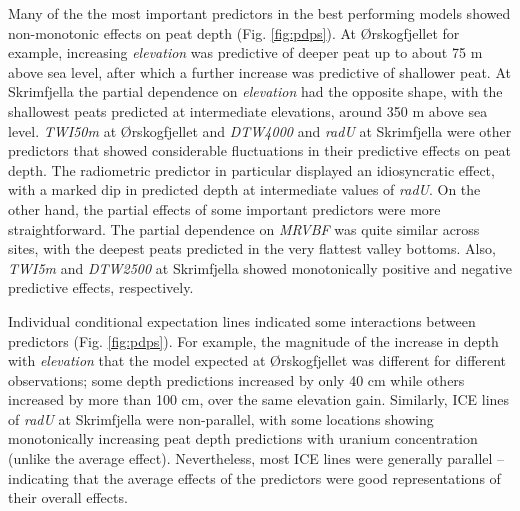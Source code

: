 \documentclass[soil, manuscript]{copernicus}
\begin{document}
Many of the the most important predictors in the best performing models showed non-monotonic effects on peat depth (Fig. \ref{fig:pdps}).
At Ørskogfjellet for example, increasing \emph{elevation} was predictive of deeper peat up to about 75 m above sea level, after which a further increase was predictive of shallower peat.
At Skrimfjella the partial dependence on \emph{elevation} had the opposite shape, with the shallowest peats predicted at intermediate elevations, around 350 m above sea level.
\emph{TWI50m} at Ørskogfjellet and \emph{DTW4000} and \emph{radU} at Skrimfjella were other predictors that showed considerable fluctuations in their predictive effects on peat depth.
The radiometric predictor in particular displayed an idiosyncratic effect, with a marked dip in predicted depth at intermediate values of \emph{radU}.
On the other hand, the partial effects of some important predictors were more straightforward.
The partial dependence on \emph{MRVBF} was quite similar across sites, with the deepest peats predicted in the very flattest valley bottoms.
Also, \emph{TWI5m} and \emph{DTW2500} at Skrimfjella showed monotonically positive and negative predictive effects, respectively.

Individual conditional expectation lines indicated some interactions between predictors (Fig. \ref{fig:pdps}).
For example, the magnitude of the increase in depth with \emph{elevation} that the model expected at Ørskogfjellet was different for different observations; some depth predictions increased by only 40 cm while others increased by more than 100 cm, over the same elevation gain.
Similarly, ICE lines of \emph{radU} at Skrimfjella were non-parallel, with some locations showing monotonically increasing peat depth predictions with uranium concentration (unlike the average effect).
Nevertheless, most ICE lines were generally parallel -- indicating that the average effects of the predictors were good representations of their overall effects.
\end{document}
